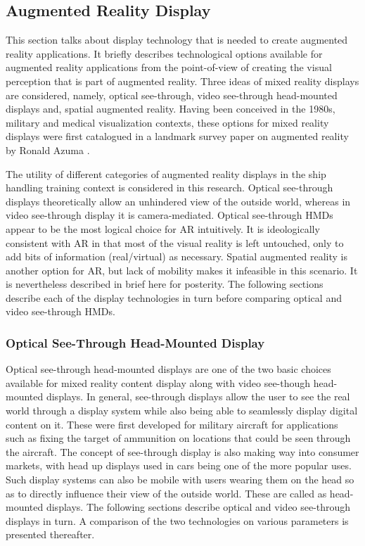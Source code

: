 \subsection{Augmented Reality Display}
This section talks about display technology that is needed to create augmented reality applications.%
It briefly describes technological options available for augmented reality applications from the point-of-view of creating the visual perception that is part of augmented reality. Three ideas of mixed reality displays are considered, namely, optical see-through, video see-through head-mounted displays and, spatial augmented reality. Having been conceived in the 1980s, military and medical visualization contexts, these options for mixed reality displays were first catalogued in a landmark survey paper on augmented reality by Ronald Azuma \parencite{azuma1997survey}. 

The utility of different categories of augmented reality displays in the ship handling training context is considered in this research. Optical see-through displays theoretically allow an unhindered view of the outside world, whereas in video see-through display it is camera-mediated. Optical see-through HMDs appear to be the most logical choice for AR intuitively. It is ideologically consistent with AR in that most of the visual reality is left untouched, only to add bits of information (real/virtual) as necessary. Spatial augmented reality is another option for AR, but lack of mobility makes it infeasible in this scenario. It is nevertheless described in brief here for posterity. The following sections describe each of the display technologies in turn before comparing optical and video see-through HMDs. 

\subsubsection{Optical See-Through Head-Mounted Display}
Optical see-through head-mounted displays are one of the two basic choices available for mixed reality content display along with video see-though head-mounted displays. In general, see-through displays allow the user to see the real world through a display system while also being able to seamlessly display digital content on it. These were first developed for military aircraft for applications such as fixing the target of ammunition on locations that could be seen through the aircraft. The concept of see-through display is also making way into consumer markets, with head up displays used in cars being one of the more popular uses. Such display systems can also be mobile with users wearing them on the head so as to directly influence their view of the outside world. These are called as head-mounted displays. The following sections describe optical and video see-through displays in turn. A comparison of the two technologies on various parameters is presented thereafter.

